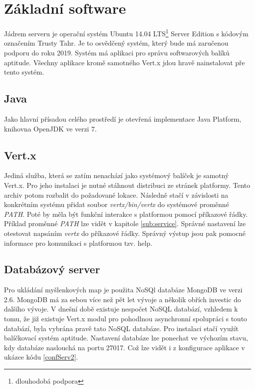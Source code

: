 \section{Základní software}

Jádrem serveru je operační systém Ubuntu \cite{ubuntu} 14.04 LTS\footnote{dlouhodobá podpora} Server Edition s kódovým označením 
Trusty Tahr. Je to osvědčený systém, který bude má zaručenou podporu do roku 2019. Systém má aplikaci pro správu softwarových balíků 
aptitude. Všechny aplikace kromě samotného Vert.x jdou hravě nainstalovat pře tento systém.

\subsection{Java}

Jako hlavní přísadou celého prostředí je otevřená implementace Java Platform, knihovna OpenJDK ve verzi 7.

\subsection{Vert.x}

Jediná služba, která se zatím nenachází jako systémový balíček je samotný Vert.x. Pro jeho instalaci je nutné stáhnout distribuci ze stránek platformy. Tento archiv potom rozbalit do požadované lokace. Následně stačí v závislosti na konkrétním systému přidat soubor \emph{vertx/bin/vertx} do systémové proměnné \emph{PATH}. Poté by měla být funkční interakce s platformou pomocí příkazové řádky. Příklad proměnné \emph{PATH} lze vidět v kapitole \ref{sub:service}. Správné nastavení lze otestovat napsáním \emph{vertx} do příkazové řádky. Správný výstup jsou pak pomocné informace pro komunikaci s platformou tzv. help.

\subsection{Databázový server}

Pro ukládání myšlenkových map je použita NoSQl databáze MongoDB ve verzi 2.6. MongoDB má za sebou více než pět let vývoje a několik obřích investic \cite{mongodb} do dalšího vývoje. V dnešní době existuje nespočet NoSQL databází, vzhledem k tomu, že již existuje Vert.x modul pro pohodlnou asynchronní spolupráci s touto databází, byla vybrána pravě tato NoSQL databáze. Pro instalaci stačí využít balíčkovací systém aptitude. Nastavení databáze lze ponechat ve výchozím stavu, kdy databáze naslouchá na portu 27017. Což lze vidět i z konfigurace aplikace v ukázce kódu \ref{confServ2}.

